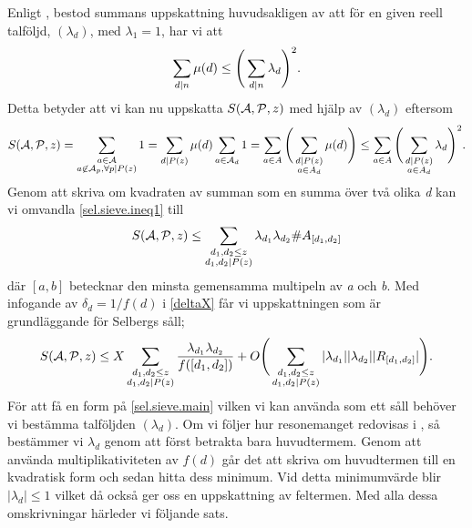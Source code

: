 Enligt \cite{cojocarumurty}, bestod summans uppskattning huvudsakligen av att för en given reell talföljd, \((\lambda_d)\), med \(\lambda_1 = 1\), har vi att 
\begin{equation}
    \sum_{d\divides n}\mu(d) \leq \Bigg(\sum_{d\divides n}\lambda_d\Bigg)^2.\nonumber
\end{equation}
Detta betyder att vi kan nu uppskatta \(\S{A}{P}{z}\) med hjälp av \((\lambda_d)\) eftersom
\begin{equation}
\S{A}{P}{z} = \sum_{\substack{a\in \mathcal{A}\\a\not\in\mathcal{A}_p,\forall p\divides P(z)}} 1 = \sum_{d\divides P(z)} \mu(d) \sum_{a\in\mathcal{A}_d}1 = \sum_{a\in A} \Bigg(\sum_{\substack{d\divides P(z)\\a\in A_d}}\mu(d)\Bigg)\leq \sum_{a\in A}\Bigg(\sum_{\substack{d\divides P(z)\\a\in A_d}}\lambda_d\Bigg)^2.\label{sel.sieve.ineq1}
\end{equation}
Genom att skriva om kvadraten av summan som en summa över två olika \textit{d} kan vi omvandla \eqref{sel.sieve.ineq1} till
\begin{equation}
    \S{A}{P}{z} \leq \sum_{\substack{d_1,d_2\leq z\\d_1,d_2\divides P(z)}}\lambda_{d_1}\lambda_{d_2}\#A_{[d_1, d_2]}\nonumber
\end{equation}
där \([a, b]\) betecknar den minsta gemensamma multipeln av \textit{a} och \textit{b}. 
Med infogande av \(\delta_d = 1/f(d)\) i \eqref{deltaX} får vi uppskattningen som är grundläggande för Selbergs såll;
\begin{equation}
    \S{A}{P}{z} \leq X\sum_{\substack{d_1,d_2\leq z\\d_1,d_2\divides P(z)}}\frac{\lambda_{d_1}\lambda_{d_2}}{f([d_1,d_2])} + O\Bigg(\sum_{\substack{d_1,d_2\leq z\\d_1,d_2\divides P(z)}}|\lambda_{d_1}||\lambda_{d_2}||R_{[d_1, d_2]}|\Bigg)\label{sel.sieve.main}.
\end{equation}
För att få en form på \eqref{sel.sieve.main} vilken vi kan använda som ett såll behöver vi bestämma talföljden \((\lambda_d)\). 
Om vi följer hur resonemanget redovisas i \cite{cojocarumurty}, så bestämmer vi \(\lambda_d\) genom att först betrakta bara huvudtermem. 
Genom att använda multiplikativiteten av \(f(d)\) går det att skriva om huvudtermen till en kvadratisk form och sedan hitta dess minimum. 
Vid detta minimumvärde blir \(|\lambda_d|\leq 1\) vilket då också ger oss en uppskattning av feltermen. Med alla dessa omskrivningar härleder vi följande sats.

